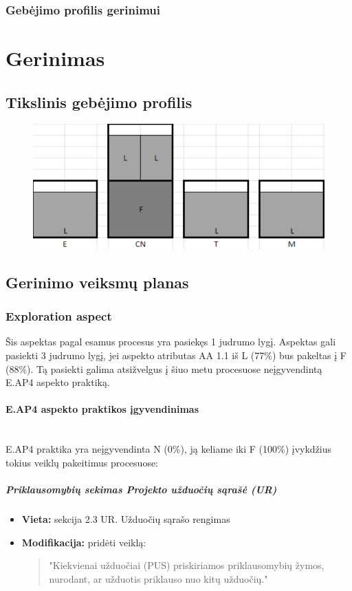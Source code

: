 \documentclass{article}
\newcommand{\subsubsubsection}[1]{\paragraph{#1}\mbox{}\\}
\begin{document}
\subsubsection{Gebėjimo profilis gerinimui}


\section{Gerinimas}

\subsection{Tikslinis gebėjimo profilis}
\begin{figure}[h]
    \centering
    \includegraphics[width=0.75\linewidth]{tikslinis-profilis.png}
    \label{fig:enter-label}
\end{figure}
\subsection{Gerinimo veiksmų planas}

\subsubsection{Exploration aspect}

Šis aspektas pagal esamus procesus yra pasiekęs 1 judrumo lygį. Aspektas gali pasiekti 3 judrumo lygį, jei aspekto atributas
AA 1.1 iš L (77\%) bus pakeltas į F (88\%). Tą pasiekti galima atsižvelgus į šiuo metu procesuose neįgyvendintą E.AP4 aspekto praktiką.

\pagebreak
\subsubsubsection{E.AP4 aspekto praktikos įgyvendinimas}

E.AP4 praktika yra neįgyvendinta N (0\%), ją keliame iki F (100\%) įvykdžius tokius veiklų pakeitimus procesuose:

\subparagraph{Priklausomybių sekimas Projekto užduočių sąrašė (UR)}
\begin{itemize}
    \item \textbf{Vieta:} sekcija 2.3 UR. Užduočių sąrašo rengimas
    \item \textbf{Modifikacija:} pridėti veiklą:
    \begin{quote}
        "Kiekvienai užduočiai (PUS) priskiriamos priklausomybių žymos, nurodant, ar užduotis priklauso nuo kitų užduočių."
    \end{quote}
\end{itemize}
\end{document}
